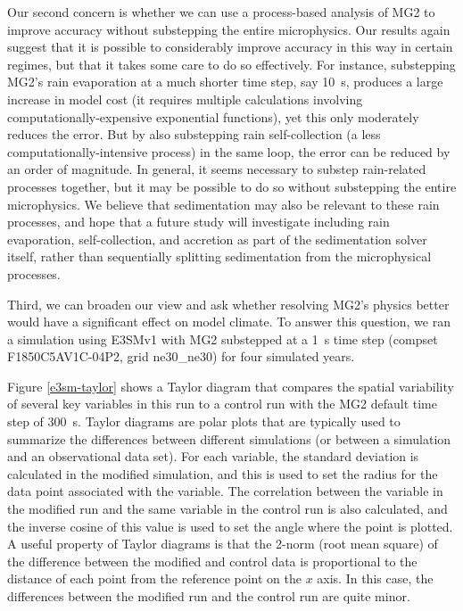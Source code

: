 \documentclass [11pt, proquest] {uwthesis}[2020/02/24]
\begin{document}
Our second concern is whether we can use a process-based analysis of MG2 to improve accuracy without substepping the entire microphysics. Our results again suggest that it is possible to considerably improve accuracy in this way in certain regimes, but that it takes some care to do so effectively. For instance, substepping MG2's rain evaporation at a much shorter time step, say \SI{10}{\second}, produces a large increase in model cost (it requires multiple calculations involving computationally-expensive exponential functions), yet this only moderately reduces the error. But by also substepping rain self-collection (a less computationally-intensive process) in the same loop, the error can be reduced by an order of magnitude. In general, it seems necessary to substep rain-related processes together, but it may be possible to do so without substepping the entire microphysics. We believe that sedimentation may also be relevant to these rain processes, and hope that a future study will investigate including rain evaporation, self-collection, and accretion as part of the sedimentation solver itself, rather than sequentially splitting sedimentation from the microphysical processes.

Third, we can broaden our view and ask whether resolving MG2's physics better would have a significant effect on model climate. To answer this question, we ran a simulation using E3SMv1 with MG2 substepped at a \SI{1}{\second} time step (compset F1850C5AV1C-04P2, grid ne30\_ne30) for four simulated years.

Figure \ref{e3sm-taylor} shows a Taylor diagram \parencite{Taylor2001} that compares the spatial variability of several key variables in this run to a control run with the MG2 default time step of \SI{300}{\second}. Taylor diagrams are polar plots that are typically used to summarize the differences between different simulations (or between a simulation and an observational data set). For each variable, the standard deviation is calculated in the modified simulation, and this is used to set the radius for the data point associated with the variable. The correlation between the variable in the modified run and the same variable in the control run is also calculated, and the inverse cosine of this value is used to set the angle where the point is plotted. A useful property of Taylor diagrams is that the \num{2}-norm (root mean square) of the difference between the modified and control data is proportional to the distance of each point from the reference point on the $x$ axis. In this case, the differences between the modified run and the control run are quite minor.
\end{document}
